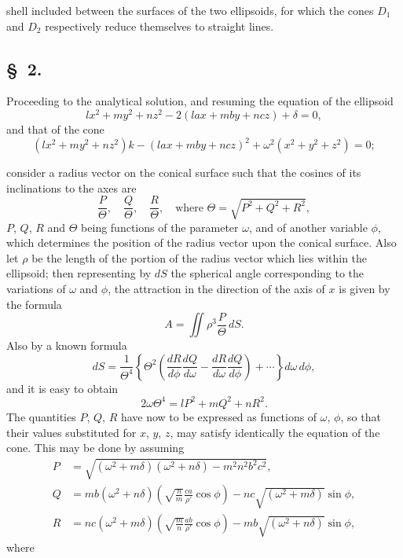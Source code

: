 \documentclass[11pt,a4paper]{book}
\begin{document}
shell included between the surfaces of the two ellipsoids, for which the cones $D_{1}$ and $D_{2}$ respectively reduce themselves to straight lines.

\subsection*{\S~2.}

Proceeding to the analytical solution, and resuming the equation of the ellipsoid
\[
lx^{2} + my^{2} + nz^{2} - 2(lax + mby + ncz) + \delta = 0,
\]
and that of the cone
\[
(lx^{2} + my^{2} + nz^{2})k - (lax + mby + ncz)^{2} + \omega^{2}(x^{2} + y^{2} + z^{2}) = 0;
\]

\newpage

\setcounter{page}{435}

consider a radius vector on the conical surface such that the cosines of its inclinations to the axes are
\[
\frac{P}{\Theta}, \quad \frac{Q}{\Theta}, \quad \frac{R}{\Theta}, \quad \text{where } \Theta = \sqrt{P^{2} + Q^{2} + R^{2}},
\]
$P$, $Q$, $R$ and $\Theta$ being functions of the parameter $\omega$, and of another variable $\phi$, which determines the position of the radius vector upon the conical surface. Also let $\rho$ be the length of the portion of the radius vector which lies within the ellipsoid; then representing by $dS$ the spherical angle corresponding to the variations of $\omega$ and $\phi$, the attraction in the direction of the axis of $x$ is given by the formula
\[
A = \iint \rho^{3} \frac{P}{\Theta}\, dS.
\]
Also by a known formula
\[
dS = \frac{1}{\Theta^{4}} \left\{ \Theta^{2}\left(\frac{dR}{d\phi}\frac{dQ}{d\omega} - \frac{dR}{d\omega}\frac{dQ}{d\phi}\right) + \cdots \right\} d\omega\, d\phi,
\]
and it is easy to obtain
\[
2\omega\Theta^{4} = lP^{2} + mQ^{2} + nR^{2}.
\]
The quantities $P$, $Q$, $R$ have now to be expressed as functions of $\omega$, $\phi$, so that their values substituted for $x$, $y$, $z$, may satisfy identically the equation of the cone. This may be done by assuming
\begin{align*}
P &= \sqrt{(\omega^{2} + m\delta)(\omega^{2} + n\delta) - m^{2}n^{2}b^{2}c^{2}}, \\
Q &= mb(\omega^{2} + n\delta)\left(\sqrt{\frac{n}{m}}\frac{ca}{\rho'}\cos\phi\right) - nc\sqrt{(\omega^{2} + m\delta)}\sin\phi, \\
R &= nc(\omega^{2} + m\delta)\left(\sqrt{\frac{m}{n}}\frac{ab}{\rho'}\cos\phi\right) - mb\sqrt{(\omega^{2} + n\delta)}\sin\phi,
\end{align*}
where
\end{document}
